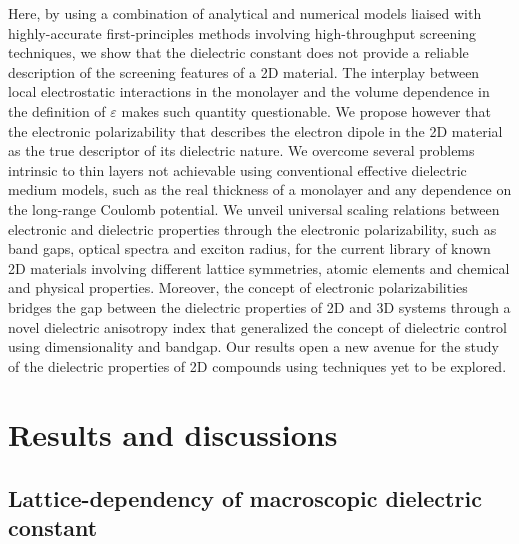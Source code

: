 \documentclass[journal=ancac3,manuscript=article,email=true,hyperref=true,keywords=false]{achemso}
\begin{document}
Here, by using a combination of analytical and numerical models liaised with 
highly-accurate first-principles methods involving high-throughput screening 
techniques, we show that the dielectric constant does not provide a reliable
description of the screening features of a 2D material. The interplay between local 
electrostatic interactions in the monolayer and the volume dependence 
in the definition of $\varepsilon$ makes such quantity questionable. 
%
%
We propose however that the electronic polarizability that describes 
the electron dipole in the 2D material as the true descriptor 
of its dielectric nature. 
%
%
We overcome several problems intrinsic to thin layers not achievable using conventional 
effective dielectric medium models, such as the real thickness of a monolayer and 
any dependence on the long-range Coulomb potential. 
We unveil universal scaling relations between electronic and dielectric properties through 
the electronic polarizability, such as band gaps, optical spectra and exciton radius, for the 
current library of known 2D materials involving different lattice symmetries, 
atomic elements and chemical and physical properties. 
%
Moreover, the concept of electronic polarizabilities bridges the
gap between the dielectric properties of 2D and 3D systems through a novel 
dielectric anisotropy index that generalized the concept of dielectric control 
using dimensionality and bandgap. 
Our results open a new avenue for the study of the 
dielectric properties of 2D compounds using techniques yet to be explored. 





\section{Results and discussions}
\label{sec:results-discussions}

\subsection{Lattice-dependency of macroscopic dielectric constant}
\label{sec:latt-depend-macr}
\end{document}
